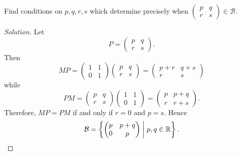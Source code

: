  Find conditions on $p, q, r, s$ which determine precisely
when $\begin{pmatrix} p & q \\ r & s \end{pmatrix} \in \mathcal{B}$.
\begin{proof}[Solution]
  Let
  \begin{equation*}
    P = \begin{pmatrix} p & q \\ r & s \end{pmatrix}.
  \end{equation*}
  Then
  \begin{equation*}
    MP = \begin{pmatrix} 1 & 1 \\ 0 & 1 \end{pmatrix}
    \begin{pmatrix} p & q \\ r & s \end{pmatrix}
    = \begin{pmatrix} p + r & q + s \\ r & s \end{pmatrix}
  \end{equation*}
  while
  \begin{equation*}
    PM = \begin{pmatrix} p & q \\ r & s \end{pmatrix}
    \begin{pmatrix} 1 & 1 \\ 0 & 1 \end{pmatrix}
    = \begin{pmatrix} p & p + q \\ r & r + s \end{pmatrix}.
  \end{equation*}
  Therefore, $MP = PM$ if and only if $r = 0$ and $p = s$. Hence
  \begin{equation*}
    \mathcal{B} = \left\{ \begin{pmatrix} p & p + q \\ 0 & p \end{pmatrix}
      \;\middle|\; p, q\in\mathbb{R} \right\}. \qedhere
  \end{equation*}
\end{proof}

